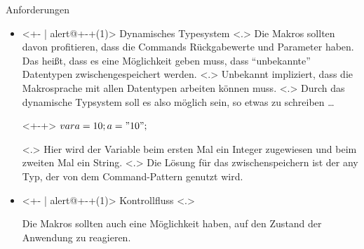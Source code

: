   \begin{frame}{Anforderungen}
    \begin{itemize}
      \item<+- | alert@+-+(1)>
        Dynamisches Typesystem
            \note[item]<.>{
              Die Makros sollten davon profitieren, dass die Commands Rückgabewerte und Parameter haben. Das heißt, dass es eine Möglichkeit geben muss, dass ``unbekannte'' Datentypen zwischengespeichert werden.
            }
            \note[item]<.>{
              Unbekannt impliziert, dass die Makrosprache mit allen Datentypen arbeiten können muss.
            }
            \note[item]<.>{
              Durch das dynamische Typsystem soll es also möglich sein, so etwas zu schreiben \ldots
            }
        \begin{uncoverenv}<+-+>%
          \tabto{4.6cm}
          \myMIn$var a = 10; a = "10";$
        \end{uncoverenv}
            \note[item]<.>{
              Hier wird der Variable  beim ersten Mal ein Integer zugewiesen und beim zweiten Mal ein String.
            }
            \note[item]<.>{
              Die Lösung für das zwischenspeichern ist der any Typ, der von dem Command-Pattern genutzt wird.
            }
      \item<+- | alert@+-+(1)>
        Kontrollfluss
            \note[item]<.>{
              Die Makros sollten auch eine Möglichkeit haben, auf den Zustand der Anwendung zu reagieren.

}
\end{itemize}
\end{frame}
